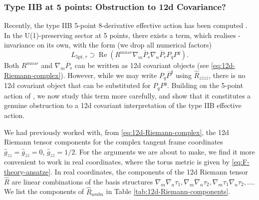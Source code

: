 \subsubsection{Type IIB at 5 points: Obstruction to 12d Covariance?}
\label{sec:5-pt-obstruction}

Recently, the type IIB 5-point 8-derivative effective action has been computed \cite{Liu:2025uqu,Claasen:2026owa}.
In the U(1)-preserving sector at 5 points, there exists a term, which realises \SLZ{}-invariance on its own, with the form (we drop all numerical factors)
\begin{equation}
L_{\text{5pt},\tau} \supset
\operatorname{Re}\left(R^{mnsr} \nabla_m \overline{P}_s \nabla_n \overline{P}_r P_q P^q\right).
\label{eq:12d-obstruction}
\end{equation}
Both $R^{mnsr}$ and $\nabla_m \overline{P}_s$ can be written as 12d covariant objects (see \eqref{eq:12d-Riemann-complex}).
However, while we may write $P_q \overline{P}^q$ using $\widehat{R}_{z\overline{z}z\overline{z}}$, there is no 12d covariant object that can be substituted for $P_q P^q$.
Building on the 5-point action of \cite{Liu:2025uqu}, we now study this term more carefully, and show that it constitutes a genuine obstruction to a 12d covariant interpretation of the type IIB effective action.

We had previously worked with, from \eqref{eq:12d-Riemann-complex}, the 12d Riemann tensor components for the complex tangent frame coordinates $\widehat{g}_{zz} = \widehat{g}_{\overline{z}\overline{z}} = 0$, $\widehat{g}_{z\overline{z}} = 1/2$. 
For the arguments we are about to make, we find it more convenient to work in real coordinates, where the torus metric is given by \eqref{eq:F-theory-ansatze}.
In real coordinates, the components of the 12d Riemann tensor $\widehat{R}$ are linear combinations of the basis structures $\nabla_m \nabla_n \tau_1, \nabla_m \nabla_n \tau_2, \nabla_m \tau_1 \nabla_n \tau_2, \dots$.
We list the components of $\widehat{R}_{ambn}$ in Table \ref{tab:12d-Riemann-components}.


